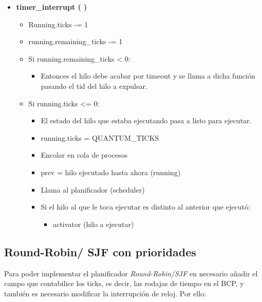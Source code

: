 \documentclass[10pt, spanish, pdftex]{template/UC3M_document}
\begin{document}
\begin{itemize}
    \item \textbf{timer\_interrupt ( )}
    \vspace{-2mm}
    \begin{itemize}
     \setlength{\itemsep}{-1.5mm}
        \item Running.ticks -= 1
        \item running.remaining\_ticks -= 1
        \item Si running.remaining\_ticks < 0:
        \vspace{-2mm}
        \begin{itemize}
        \setlength{\itemsep}{-1.5mm}
            \item Entonces el hilo debe acabar por timeout y se llama a dicha función pasando el tid del hilo a expulsar.
        \end{itemize}
        \item Si running.ticks <= 0:
        \vspace{-2mm}
        \begin{itemize}
        \setlength{\itemsep}{-1.5mm}
            \item El estado del hilo que estaba ejecutando pasa a listo para ejecutar.
            \item running.ticks = QUANTUM\_TICKS
            \item Encolar en cola de procesos
            \item prev = hilo ejecutado hasta ahora (running)
            \item Llama al planificador (scheduler)
            \item Si el hilo al que le toca ejecutar es distinto al anterior que ejecutó:
            \vspace{-2mm}
            \begin{itemize}
            \setlength{\itemsep}{-1.5mm}
                \item activator (hilo a ejecutar)
            \end{itemize}
        \end{itemize}
    \end{itemize}
\end{itemize}

\subsection{Round-Robin/ SJF con prioridades}
Para poder implementar el planificador \textit{Round-Robin/SJF} en necesario añadir el campo que contabilice los ticks, es decir, las rodajas de tiempo en el BCP, y también es necesario modificar la interrupción de reloj. Por ello:
\end{document}
